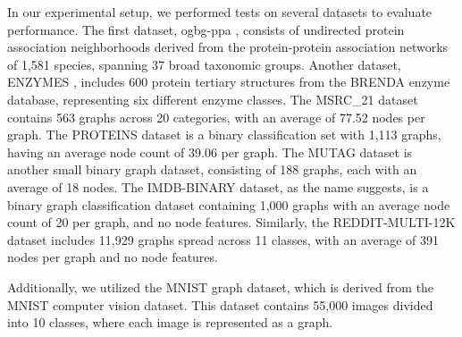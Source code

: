 \label{sec:experimental_setting}
{
In our experimental setup, we performed tests on several datasets to evaluate performance. The first dataset, ogbg-ppa \cite{PPA}, consists of undirected protein association neighborhoods derived from the protein-protein association networks of 1,581 species, spanning 37 broad taxonomic groups. Another dataset, ENZYMES \cite{proteins}, includes 600 protein tertiary structures from the BRENDA enzyme database, representing six different enzyme classes. The MSRC\_21 dataset \cite{Neumann2016} contains 563 graphs across 20 categories, with an average of 77.52 nodes per graph. The PROTEINS \cite{proteins} dataset is a binary classification set with 1,113 graphs, having an average node count of 39.06 per graph. The MUTAG \cite{mutag} dataset is another small binary graph dataset, consisting of 188 graphs, each with an average of 18 nodes. The IMDB-BINARY \cite{imdbbinary} dataset, as the name suggests, is a binary graph classification dataset containing 1,000 graphs with an average node count of 20 per graph, and no node features. Similarly, the REDDIT-MULTI-12K dataset \cite{imdbbinary} includes 11,929 graphs spread across 11 classes, with an average of 391 nodes per graph and no node features.

Additionally, we utilized the MNIST graph dataset, which is derived from the MNIST computer vision dataset. This dataset contains 55,000 images divided into 10 classes, where each image is represented as a graph. 

}
